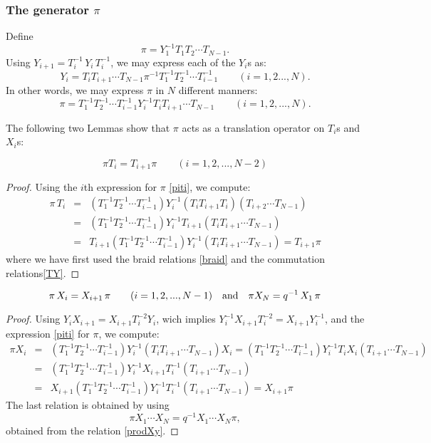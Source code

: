\subsubsection{The generator $\pi$}

Define
$$\pi=Y_1^{-1}T_1T_2\cdots T_{N-1} . $$
Using $Y_{i+1}=T_i^{-1}\,Y_i\,T_i^{-1}$, we may express each of the $Y_i$s as:
$$Y_i=T_{i}T_{i+1}\cdots T_{N-1} \pi^{-1} T_1^{-1}T_2^{-1}\cdots T_{i-1}^{-1}\qquad (i=1,2...,N).$$
In other words, we may express $\pi$ in $N$ different manners:
\begin{equation}\label{piti}
\pi=T_1^{-1}T_2^{-1}\cdots T_{i-1}^{-1} Y_i^{-1} T_iT_{i+1}\cdots T_{N-1} \qquad (i=1,2,...,N).
\end{equation}

The following two Lemmas show that $\pi$ acts as a translation operator on $T_i$s and $X_i$s:
\begin{lemma}
$$\pi T_i=T_{i+1}\pi \qquad (i=1,2,...,N-2)$$
\end{lemma}
\begin{proof}
Using the $i$th expression for $\pi$ \eqref{piti}, we compute:
\begin{eqnarray*}\pi\, T_i&=&(T_1^{-1}T_2^{-1}\cdots T_{i-1}^{-1}) Y_i^{-1} (T_iT_{i+1}T_i)( T_{i+2}\cdots T_{N-1})\\
&=&(T_1^{-1}T_2^{-1}\cdots T_{i-1}^{-1}) Y_i^{-1}T_{i+1}(T_iT_{i+1}\cdots T_{N-1})\\
&=&T_{i+1}(T_1^{-1}T_2^{-1}\cdots T_{i-1}^{-1}) Y_i^{-1}(T_iT_{i+1}\cdots T_{N-1})=T_{i+1}\pi
\end{eqnarray*}
where we have first used the braid relations \eqref{braid} and the commutation relations\eqref{TY}.
\end{proof}



\begin{lemma}
$$\pi \, X_i=X_{i+1}\,\pi \qquad (i=1,2,...,N-1)\quad {\rm and} \quad \pi X_{N}=q^{-1}\, X_1\,\pi$$
\end{lemma}
\begin{proof}
Using
$Y_i X_{i+1}=X_{i+1} T_i^{-2} Y_i$,
wich implies $Y_i^{-1}X_{i+1} T_i^{-2}=X_{i+1}Y_i^{-1}$,
and the expression \eqref{piti} for $\pi$, we compute:
\begin{eqnarray*}
\pi X_i&=&(T_1^{-1}T_2^{-1}\cdots T_{i-1}^{-1}) Y_i^{-1} (T_i T_{i+1}\cdots T_{N-1})  X_i=
(T_1^{-1}T_2^{-1}\cdots T_{i-1}^{-1}) Y_i^{-1}T_i X_i (T_{i+1}\cdots T_{N-1})\\
&=&(T_1^{-1}T_2^{-1}\cdots T_{i-1}^{-1}) Y_i^{-1}X_{i+1}T_i^{-1} (T_{i+1}\cdots T_{N-1})\\
&=&X_{i+1}(T_1^{-1}T_2^{-1}\cdots T_{i-1}^{-1}) Y_i^{-1}T_i^{-1} (T_{i+1}\cdots T_{N-1})=X_{i+1}\pi
\end{eqnarray*}
The last relation is obtained by using 
$$\pi {X_1\cdots X_N}=q^{-1}{X_1\cdots X_N}\pi,$$ 
obtained from the relation \eqref{prodXy}.
\end{proof}


